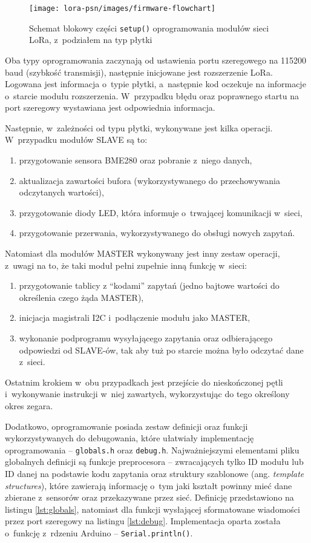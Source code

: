 \begin{figure}[!htb]
    \centering
    \texttt{[image: lora-psn/images/firmware-flowchart]}
    \caption{\label{img:firmware-flowchart}Schemat blokowy części \texttt{setup()} oprogramowania modułów sieci LoRa,
        z~podziałem na typ płytki}
\end{figure}

Oba typy oprogramowania zaczynają od ustawienia portu szeregowego na 115200 baud (szybkość transmisji), następnie
inicjowane jest rozszerzenie LoRa. Logowana jest informacja o~typie płytki, a~następnie kod oczekuje na informacje
o~starcie modułu rozszerzenia. W~przypadku błędu oraz poprawnego startu na port szeregowy wystawiana jest odpowiednia
informacja.

Następnie, w~zależności od typu płytki, wykonywane jest kilka operacji. W~przypadku modułów SLAVE są to:
\begin{enumerate}
    \item przygotowanie sensora BME280 oraz pobranie z~niego danych,
    \item aktualizacja zawartości bufora (wykorzystywanego do przechowywania odczytanych wartości),
    \item przygotowanie diody LED, która informuje o~trwającej komunikacji w~sieci,
    \item przygotowanie przerwania, wykorzystywanego do obsługi nowych zapytań.
\end{enumerate}

Natomiast dla modułów MASTER wykonywany jest inny zestaw operacji, z~uwagi na to, że taki moduł pełni zupełnie inną
funkcję w~sieci:
\begin{enumerate}
    \item przygotowanie tablicy z \enquote{kodami} zapytań (jedno bajtowe wartości do określenia czego żąda MASTER),
    \item inicjacja magistrali I2C i~podłączenie modułu jako MASTER,
    \item wykonanie podprogramu wysyłającego zapytania oraz odbierającego odpowiedzi od SLAVE-ów, tak aby tuż po
          starcie można było odczytać dane z~sieci.
\end{enumerate}
Ostatnim krokiem w~obu przypadkach jest przejście do nieskończonej pętli i~wykonywanie instrukcji w~niej zawartych,
wykorzystując do tego określony okres zegara.

Dodatkowo, oprogramowanie posiada zestaw definicji oraz funkcji wykorzystywanych do debugowania, które ułatwiały
implementację oprogramowania -- \texttt{globals.h} oraz \texttt{debug.h}. Najważniejszymi elementami pliku globalnych
definicji są funkcje preprocesora -- zwracających tylko ID modułu lub ID danej na podstawie kodu zapytania oraz
struktury szablonowe (ang. \textsl{template structures}), które zawierają informację o~tym jaki kształt powinny mieć
dane zbierane z~sensorów oraz przekazywane przez sieć. Definicję przedstawiono na listingu \ref{lst:globals}, natomiast
dla funkcji wysłającej sformatowane wiadomości przez port szeregowy na listingu \ref{lst:debug}. Implementacja oparta
została o~funkcję z~rdzeniu Arduino -- \texttt{Serial.println()}.

